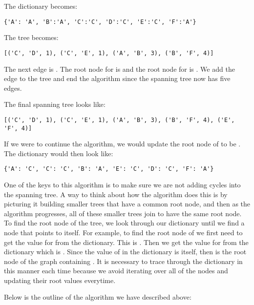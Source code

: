 The dictionary becomes:

\begin{lstlisting}
{'A': 'A', 'B':'A', 'C':'C', 'D':'C', 'E':'C', 'F':'A'}
\end{lstlisting}
The tree becomes:
\begin{lstlisting}
[('C', 'D', 1), ('C', 'E', 1), ('A', 'B', 3), ('B', 'F', 4)]
\end{lstlisting}
The next edge is .
The root node for  is  and the root node for  is .
We add the edge to the tree and end the algorithm since the spanning tree now has five edges.

The final spanning tree looks like:
\begin{lstlisting}
[('C', 'D', 1), ('C', 'E', 1), ('A', 'B', 3), ('B', 'F', 4), ('E', 'F', 4)]
\end{lstlisting}
If we were to continue the algorithm, we would update the root node of  to be . The dictionary would then look like:

\begin{lstlisting}
{'A': 'C', 'C': 'C', 'B': 'A', 'E': 'C', 'D': 'C', 'F': 'A'}
\end{lstlisting}


One of the keys to this algorithm is to make sure we are not adding cycles into the spanning tree. A way to think about how the algorithm does this is by picturing it building smaller trees that have a common root node, and then as the algorithm progresses, all of these smaller trees join to have the same root node. To find the root node of the tree, we look through our dictionary until we find a node that points to itself.
For example, to find the root node of  we first need to get the value for  from the dictionary.  This is .
Then we get the value for  from the dictionary which is .
Since the value of  in the dictionary is itself, then  is the root node of the graph containing .
It is necessary to trace through the dictionary in this manner each time because we avoid iterating over all of the nodes and updating their root values everytime.

Below is the outline of the algorithm we have described above:

